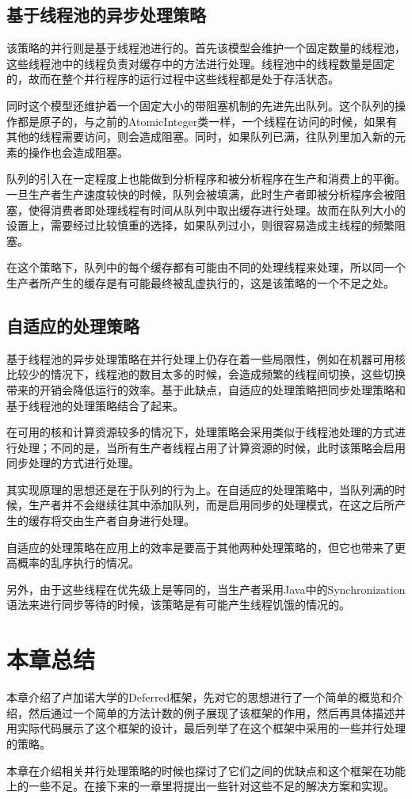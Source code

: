 \subsection{基于线程池的异步处理策略}

该策略的并行则是基于线程池进行的。首先该模型会维护一个固定数量的线程池，这些线程池中的线程负责对缓存中的方法进行处理。线程池中的线程数量是固定的，故而在整个并行程序的运行过程中这些线程都是处于存活状态。

同时这个模型还维护着一个固定大小的带阻塞机制的先进先出队列。这个队列的操作都是原子的，与之前的AtomicInteger类一样，一个线程在访问的时候，如果有其他的线程需要访问，则会造成阻塞。同时，如果队列已满，往队列里加入新的元素的操作也会造成阻塞。

队列的引入在一定程度上也能做到分析程序和被分析程序在生产和消费上的平衡。一旦生产者生产速度较快的时候，队列会被填满，此时生产者即被分析程序会被阻塞，使得消费者即处理线程有时间从队列中取出缓存进行处理。故而在队列大小的设置上，需要经过比较慎重的选择，如果队列过小，则很容易造成主线程的频繁阻塞。

在这个策略下，队列中的每个缓存都有可能由不同的处理线程来处理，所以同一个生产者所产生的缓存是有可能最终被乱虚执行的，这是该策略的一个不足之处。

\subsection{自适应的处理策略}

基于线程池的异步处理策略在并行处理上仍存在着一些局限性，例如在机器可用核比较少的情况下，线程池的数目太多的时候，会造成频繁的线程间切换，这些切换带来的开销会降低运行的效率。基于此缺点，自适应的处理策略把同步处理策略和基于线程池的处理策略结合了起来。

在可用的核和计算资源较多的情况下，处理策略会采用类似于线程池处理的方式进行处理；不同的是，当所有生产者线程占用了计算资源的时候，此时该策略会启用同步处理的方式进行处理。

其实现原理的思想还是在于队列的行为上。在自适应的处理策略中，当队列满的时候，生产者并不会继续往其中添加队列，而是启用同步的处理模式，在这之后所产生的缓存将交由生产者自身进行处理。

自适应的处理策略在应用上的效率是要高于其他两种处理策略的，但它也带来了更高概率的乱序执行的情况。

另外，由于这些线程在优先级上是等同的，当生产者采用Java中的Synchronization语法来进行同步等待的时候，该策略是有可能产生线程饥饿的情况的。

\section{本章总结}

本章介绍了卢加诺大学的Deferred框架，先对它的思想进行了一个简单的概览和介绍，然后通过一个简单的方法计数的例子展现了该框架的作用，然后再具体描述并用实际代码展示了这个框架的设计，最后列举了在这个框架中采用的一些并行处理的策略。

本章在介绍相关并行处理策略的时候也探讨了它们之间的优缺点和这个框架在功能上的一些不足。在接下来的一章里将提出一些针对这些不足的解决方案和实现。
